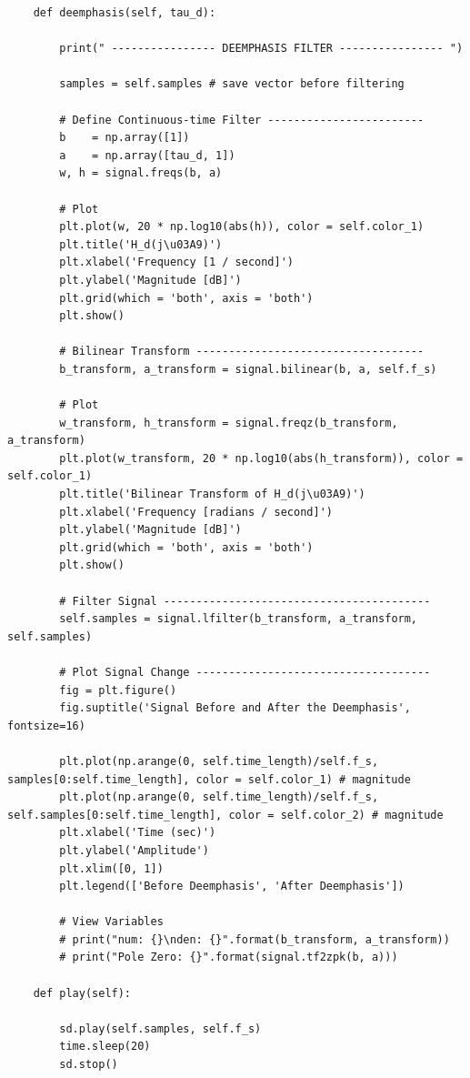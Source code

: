 \documentclass{article}
\begin{document}
\begin{lstlisting}
	def deemphasis(self, tau_d):

		print(" ---------------- DEEMPHASIS FILTER ---------------- ")

		samples = self.samples # save vector before filtering

        # Define Continuous-time Filter ------------------------
		b    = np.array([1])
		a    = np.array([tau_d, 1])
		w, h = signal.freqs(b, a)

		# Plot
		plt.plot(w, 20 * np.log10(abs(h)), color = self.color_1)
		plt.title('H_d(j\u03A9)')
		plt.xlabel('Frequency [1 / second]')
		plt.ylabel('Magnitude [dB]')
		plt.grid(which = 'both', axis = 'both')
		plt.show()

		# Bilinear Transform -----------------------------------
		b_transform, a_transform = signal.bilinear(b, a, self.f_s)

		# Plot
		w_transform, h_transform = signal.freqz(b_transform, a_transform)
		plt.plot(w_transform, 20 * np.log10(abs(h_transform)), color = self.color_1)
		plt.title('Bilinear Transform of H_d(j\u03A9)')
		plt.xlabel('Frequency [radians / second]')
		plt.ylabel('Magnitude [dB]')
		plt.grid(which = 'both', axis = 'both')
		plt.show()

		# Filter Signal -----------------------------------------
		self.samples = signal.lfilter(b_transform, a_transform, self.samples)

		# Plot Signal Change ------------------------------------
		fig = plt.figure()
		fig.suptitle('Signal Before and After the Deemphasis', fontsize=16)
		
		plt.plot(np.arange(0, self.time_length)/self.f_s, samples[0:self.time_length], color = self.color_1) # magnitude
		plt.plot(np.arange(0, self.time_length)/self.f_s, self.samples[0:self.time_length], color = self.color_2) # magnitude
		plt.xlabel('Time (sec)')
		plt.ylabel('Amplitude')
		plt.xlim([0, 1])
		plt.legend(['Before Deemphasis', 'After Deemphasis'])

		# View Variables
		# print("num: {}\nden: {}".format(b_transform, a_transform))
		# print("Pole Zero: {}".format(signal.tf2zpk(b, a)))

	def play(self):

		sd.play(self.samples, self.f_s)
		time.sleep(20)
		sd.stop()

\end{lstlisting}
\end{document}

